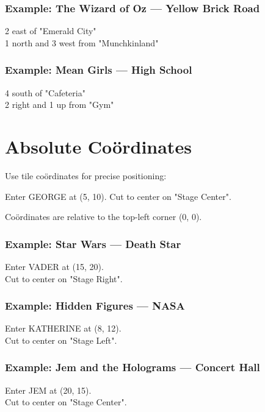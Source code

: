 \documentclass[11pt,letterpaper,oldstylefigures]{memoir}
\newenvironment{FountainExample}
  {\begingroup
  \ttfamily\small
   \setlength{\parindent}{0pt}
  \setlength{\parskip}{0.5em}
  \allowdisplaybreaks
  \setlength{\displaywidowpenalty}{0}
  \setlength{\widowpenalty}{0}
  \setlength{\clubpenalty}{0}
  \setlength{\interlinepenalty}{0}
}
  {\endgroup}
\begin{document}
\subsubsection{Example: The Wizard of Oz — Yellow Brick Road}
\begin{FountainExample}
2 east of "Emerald City"\\
1 north and 3 west from "Munchkinland"
\end{FountainExample}

\subsubsection{Example: Mean Girls — High School}
\begin{FountainExample}
4 south of "Cafeteria"\\
2 right and 1 up from "Gym"
\end{FountainExample}

\section{Absolute Coördinates}

Use tile coördinates for precise positioning:

\begin{FountainExample}
Enter GEORGE at (5, 10).
Cut to center on "Stage Center".
\end{FountainExample}

Coördinates are relative to the top-left corner (0, 0).

\subsubsection{Example: Star Wars — Death Star}
\begin{FountainExample}
Enter VADER at (15, 20).\\
Cut to center on "Stage Right".
\end{FountainExample}

\subsubsection{Example: Hidden Figures — NASA}
\begin{FountainExample}
Enter KATHERINE at (8, 12).\\
Cut to center on "Stage Left".
\end{FountainExample}

\subsubsection{Example: Jem and the Holograms — Concert Hall}
\begin{FountainExample}
Enter JEM at (20, 15).\\
Cut to center on "Stage Center".
\end{FountainExample}
\end{document}
